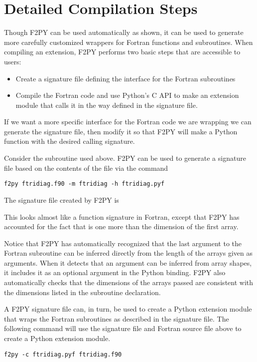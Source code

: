 \section*{Detailed Compilation Steps}
Though F2PY can be used automatically as shown, it can be used to generate more carefully customized wrappers for Fortran functions and subroutines.
When compiling an extension, F2PY performs two basic steps that are accessible to users:
\begin{itemize}
\item Create a  signature file defining the interface for the Fortran subroutines
\item Compile the Fortran code and use Python's C API to make an extension module that calls it in the way defined in the signature file.
\end{itemize}
If we want a more specific interface for the Fortran code we are wrapping we can generate the signature file, then modify it so that F2PY will make a Python function with the desired calling signature.

Consider the  subroutine used above.
F2PY can be used to generate a signature file based on the contents of the file  via the command
\begin{lstlisting}[style=ShellInput]
f2py ftridiag.f90 -m ftridiag -h ftridiag.pyf
\end{lstlisting}
The signature file created by F2PY is

This looks almost like a function signature in Fortran, except that F2PY has accounted for the fact that  is one more than the dimension of the first array.

Notice that F2PY has automatically recognized that the last argument to the Fortran subroutine can be inferred directly from the length of the arrays given as arguments.
When it detects that an argument can be inferred from array shapes, it includes it as an optional argument in the Python binding.
F2PY also automatically checks that the dimensions of the arrays passed are consistent with the dimensions listed in the subroutine declaration.

A F2PY signature file can, in turn, be used to create a Python extension module that wraps the Fortran subroutines as described in the signature file.
The following command will use the signature file and Fortran source file above to create a Python extension module.
\begin{lstlisting}[style=ShellInput]
f2py -c ftridiag.pyf ftridiag.f90
\end{lstlisting}

